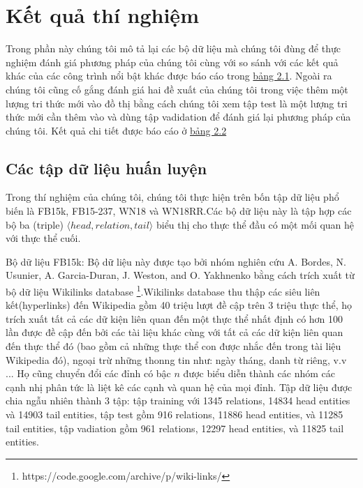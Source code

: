 


\section{Kết quả thí nghiệm}
Trong phần này chúng tôi mô tả lại các bộ dữ liệu mà chúng tôi đùng để thực nghiệm đánh giá phương pháp của chúng tôi cùng với so sánh với các kết quả khác của các công trình nổi bật khác được báo cáo trong \hyperref[tab:tab1]{bảng 2.1}. Ngoài ra chúng tôi cũng cố gắng đánh giá hai đề xuất của chúng tôi trong việc thêm một lượng tri thức mới vào đồ thị bằng cách chúng tôi xem tập test là một lượng tri thức mới cần thêm vào và dùng tập vadidation để đánh giá lại phương pháp của chúng tôi. Kết quả chi tiết được báo cáo ở \hyperref[tab:tab1]{bảng 2.2}
\subsection{Các tập dữ liệu huấn luyện} \label{datasets}
Trong thí nghiệm của chúng tôi, chúng tôi thực hiện trên bốn tập dữ liệu phổ biến là FB15k, FB15-237, WN18 và WN18RR.Các bộ dữ liệu này là tập hợp các bộ ba (triple) \(\langle head, relation, tail \rangle\) biểu thị cho thực thể đầu có một mối quan hệ với thực thể cuối.

Bộ dữ liệu FB15k: Bộ dữ liệu này được tạo bởi nhóm nghiên cứu A. Bordes, N. Usunier, A. Garcia-Duran, J. Weston, and O. Yakhnenko \cite{bordes2013translating} bằng cách trích xuất từ bộ dữ liệu Wikilinks database \footnote{https://code.google.com/archive/p/wiki-links/}.Wikilinks database thu thập các siêu liên kết(hyperlinks) đến Wikipedia gồm 40 triệu lượt đề cập trên 3 triệu thực thể, họ trích xuất tất cả các dữ kiện liên quan đến một thực thể nhất định có hơn 100 lần được đề cập đến bởi các tài liệu khác cùng với tất cả các dữ kiện liên quan đến thực thể đó (bao gồm cả những thực thể con được nhắc đến trong tài liệu Wikipedia đó), ngoại trừ những thonng tin như: ngày tháng, danh từ riêng, v.v ... Họ cũng chuyển đổi các đỉnh có bậc \(n\) được biểu diễn thành các nhóm các cạnh nhị phân tức là liệt kê các cạnh và quan hệ của mọi đỉnh. Tập dữ liệu được chia ngẫu nhiên thành 3 tập: tập training với 1345 relations, 14834 head entities và 14903 tail entities, tập test gồm 916 relations, 11886 head entities, và 11285 tail entities, tập vadiation gồm 961 relations, 12297 head entities, và 11825 tail entities.

